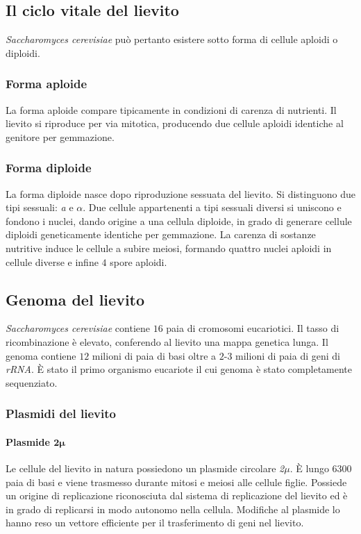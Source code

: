 	\subsection*{Il ciclo vitale del lievito}
	\emph{Saccharomyces cerevisiae} pu\`o pertanto esistere sotto forma di cellule aploidi o diploidi.

		\subsubsection*{Forma aploide}
		La forma aploide compare tipicamente in condizioni di carenza di nutrienti.
		Il lievito si riproduce per via mitotica, producendo due cellule aploidi identiche al genitore per gemmazione.

		\subsubsection*{Forma diploide}
		La forma diploide nasce dopo riproduzione sessuata del lievito.
		Si distinguono due tipi sessuali: \emph{a} e \emph{$\alpha$}.
		Due cellule appartenenti a tipi sessuali diversi si uniscono e fondono i nuclei, dando origine a una cellula diploide, in grado di generare cellule diploidi geneticamente identiche per gemmazione.
		La carenza di sostanze nutritive induce le cellule a subire meiosi, formando quattro nuclei aploidi in cellule diverse e infine $4$ spore aploidi.
		
	\subsection*{Genoma del lievito}
		\emph{Saccharomyces cerevisiae} contiene $16$ paia di cromosomi eucariotici.
		Il tasso di ricombinazione \`e elevato, conferendo al lievito una mappa genetica lunga.
		Il genoma contiene $12$ milioni di paia di basi oltre a $2$-$3$ milioni di paia di geni di \emph{rRNA}.
		\`E stato il primo organismo eucariote il cui genoma \`e stato completamente sequenziato.

		\subsubsection*{Plasmidi del lievito}

			\paragraph*{Plasmide \emph{$\mathbf{2\mu}$}}
			Le cellule del lievito in natura possiedono un plasmide circolare \emph{2$\mu$}.
			\`E lungo \num{6300} paia di basi e viene trasmesso durante mitosi e meiosi alle cellule figlie.
			Possiede un origine di replicazione riconosciuta dal sistema di replicazione del lievito ed \`e in grado di replicarsi in modo autonomo nella cellula.
			Modifiche al plasmide lo hanno reso un vettore efficiente per il trasferimento di geni nel lievito.

